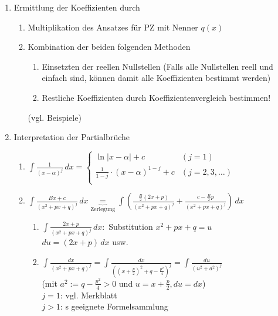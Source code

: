 \documentclass[a4paper]{scrartcl}
\begin{document}
\begin{enumerate}
\item Ermittlung der Koeffizienten durch
\begin{enumerate}
\item Multiplikation des Ansatzes für PZ mit Nenner $q(x)$
\item Kombination der beiden folgenden Methoden
\begin{enumerate}
\item Einsetzten der reellen Nullstellen (Falls alle Nullstellen reell und einfach sind, können damit alle Koeffizienten bestimmt werden)
\item Restliche Koeffizienten durch Koeffizientenvergleich bestimmen!
\end{enumerate}
(vgl. Beispiele)
\end{enumerate}
\item Interpretation der Partialbrüche
\begin{enumerate}
\item $\int \frac{1}{(x-\alpha)^j} \, dx = \left\{ \begin{array}{lr}
\ln{\lvert x - \alpha \rvert } + c & (j=1)\\
\frac{1}{1-j} \cdot (x-\alpha)^{1-j} + c & (j=2,3,\dots)\\ \end{array} \right.$
\item $\int \frac{Bx+c}{(x^2 + px +q)^j} \, dx \underbrace{=}_{\text{Zerlegung}} \int ( \frac{\frac{B}{2} (2x + p) }{(x^2 + px +q)^j} + \frac{c- \frac{B}{2} p}{(x^2 + px +q)^j} ) \, dx$
\begin{enumerate}
\item $\int \frac{ 2x+p}{(x^2 + px +q)^j} \, dx:$ Substitution $x^2+px+q=u$\\ $du=(2x+p) \, dx$ usw.
\item $\int \frac{dx}{(x^2 + px +q)^j} = \int \frac{dx}{((x + \frac{p}{2})^2 + q- \frac{p^2}{4} )^j} = \int \frac{du}{(u^2 + a^2 )^j}$\\
(mit $a^2 := q - \frac{p^2}{4} > 0$ und $ u = x + \frac{p}{2}, du=dx$)\\
$j=1$: vgl. Merkblatt\\
$j > 1$: s geeignete Formelsammlung
\end{enumerate}
\end{enumerate}
\end{enumerate}
\end{document}
